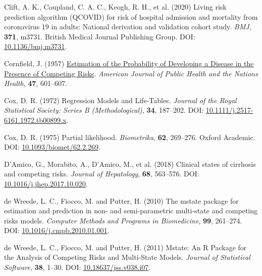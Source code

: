 \documentclass[
  letterpaper,
  paper=240mm:170mm,
  twoside=true,
  open=right,
  fontsize=10pt,
  pagesize=false,
  BCOR=15mm,
  DIV=14,
  headinclude=true,
  footinclude=false,
  headsepline=on]{scrbook}
\newlength{\cslhangindent}
\newenvironment{CSLReferences}[2] %
 {\begin{list}{}{%
  \setlength{\itemindent}{0pt}
  \setlength{\leftmargin}{0pt}
  \setlength{\parsep}{0pt}
  \ifodd #1
   \setlength{\leftmargin}{\cslhangindent}
   \setlength{\itemindent}{-1\cslhangindent}
  \fi
  \setlength{\itemsep}{#2\baselineskip}}}
 {\end{list}}
\begin{document}
\begin{CSLReferences}{1}{1}
Clift, A. K., Coupland, C. A. C., Keogh, R. H., et al. (2020) Living
risk prediction algorithm ({QCOVID}) for risk of hospital admission and
mortality from coronavirus 19 in adults: National derivation and
validation cohort study. \emph{BMJ}, \textbf{371}, m3731. British
Medical Journal Publishing Group. DOI:
\href{https://doi.org/10.1136/bmj.m3731}{10.1136/bmj.m3731}.

Cornfield, J. (1957)
\href{https://www.ncbi.nlm.nih.gov/pmc/articles/PMC1551242}{Estimation
of the {Probability} of {Developing} a {Disease} in the {Presence} of
{Competing Risks}}. \emph{American Journal of Public Health and the
Nations Health}, \textbf{47}, 601--607.

Cox, D. R. (1972) Regression {Models} and {Life-Tables}. \emph{Journal
of the Royal Statistical Society: Series B (Methodological)},
\textbf{34}, 187--202. DOI:
\href{https://doi.org/10.1111/j.2517-6161.1972.tb00899.x}{10.1111/j.2517-6161.1972.tb00899.x}.

Cox, D. R. (1975) Partial likelihood. \emph{Biometrika}, \textbf{62},
269--276. Oxford Academic. DOI:
\href{https://doi.org/10.1093/biomet/62.2.269}{10.1093/biomet/62.2.269}.

D'Amico, G., Morabito, A., D'Amico, M., et al. (2018) Clinical states of
cirrhosis and competing risks. \emph{Journal of Hepatology},
\textbf{68}, 563--576. DOI:
\href{https://doi.org/10.1016/j.jhep.2017.10.020}{10.1016/j.jhep.2017.10.020}.

de Wreede, L. C., Fiocco, M. and Putter, H. (2010) The mstate package
for estimation and prediction in non- and semi-parametric multi-state
and competing risks models. \emph{Computer Methods and Programs in
Biomedicine}, \textbf{99}, 261--274. DOI:
\href{https://doi.org/10.1016/j.cmpb.2010.01.001}{10.1016/j.cmpb.2010.01.001}.

de Wreede, L. C., Fiocco, M. and Putter, H. (2011) Mstate: {An R
Package} for the {Analysis} of {Competing Risks} and {Multi-State
Models}. \emph{Journal of Statistical Software}, \textbf{38}, 1--30.
DOI:
\href{https://doi.org/10.18637/jss.v038.i07}{10.18637/jss.v038.i07}.


\end{CSLReferences}
\end{document}
